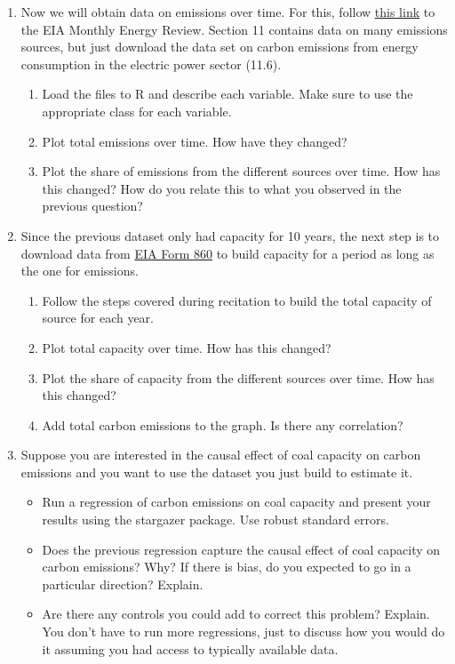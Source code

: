 \documentclass[12pt]{article}
\begin{document}
\begin{enumerate}
	\item Now we will obtain data on emissions over time. For this, follow \href{https://www.eia.gov/totalenergy/data/browser/index.php?tbl=T11.06}{this link} to the EIA Monthly Energy Review. Section 11 contains data on many emissions sources, but just download the data set on carbon emissions from energy consumption in the electric power sector (11.6).
	\begin{enumerate}
	\item Load the files to R and describe each variable. Make sure to use the appropriate class for each variable.
	\item Plot total emissions over time. How have they changed?
	\item Plot the share of emissions from the different sources over time. How has this changed? How do you relate this to what you observed in the previous question?
	\end{enumerate}
\item Since the previous dataset only had capacity for 10 years, the next step is to download data from \href{https://www.eia.gov/electricity/data/eia860/}{EIA Form 860} to build capacity for a period as long as the one for emissions. 
	\begin{enumerate}
	\item  Follow the steps covered during recitation to build the total capacity of source for each year.
	\item Plot total capacity over time. How has this changed?
	\item Plot the share of capacity from the different sources over time. How has this changed?
	\item Add total carbon emissions to the graph. Is there any correlation?
	\end{enumerate}
	\item Suppose you are interested in the causal effect of coal capacity on carbon emissions and you want to use the dataset you just build to estimate it.
		\begin{itemize}
		\item Run a regression of carbon emissions on coal capacity and present your results using the stargazer package. Use robust standard errors.
		\item 	Does the previous regression capture the causal effect of coal capacity on carbon emissions? Why? If there is bias, do you expected to go in a particular direction? Explain.
		\item Are there any controls you could add to correct this problem? Explain. You don't have to run more regressions, just to discuss how you would do it assuming you had access to typically available data.
		\end{itemize}

\end{enumerate}
\end{document}
